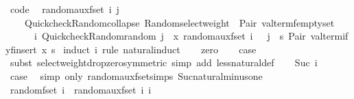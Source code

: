 \begin{isabellebody}
\isanewline
{}\isamarkupfalse%
\ {\isacharbrackleft}code{\isacharbrackright}{\isacharcolon}\isanewline
\ \ {\isachardoublequoteopen}random{\isacharunderscore}aux{\isacharunderscore}fset\ i\ j\ {\isacharequal}\isanewline
\ \ \ \ Quickcheck{\isacharunderscore}Random{\isachardot}collapse\ {\isacharparenleft}Random{\isachardot}select{\isacharunderscore}weight\ {\isacharbrackleft}{\isacharparenleft}{}{\isacharcomma}\ Pair\ valterm{\isacharunderscore}femptyset{\isacharparenright}{\isacharcomma}\isanewline
\ \ \ \ \ \ {\isacharparenleft}i{\isacharcomma}\ Quickcheck{\isacharunderscore}Random{\isachardot}random\ j\ {\isasymcirc}{\isasymrightarrow}\ {\isacharparenleft}{\isasymlambda}x{\isachardot}\ random{\isacharunderscore}aux{\isacharunderscore}fset\ {\isacharparenleft}i\ {\isacharminus}\ {}{\isacharparenright}\ j\ {\isasymcirc}{\isasymrightarrow}\ {\isacharparenleft}{\isasymlambda}s{\isachardot}\ Pair\ {\isacharparenleft}valtermify{\isacharunderscore}finsert\ x\ s{\isacharparenright}{\isacharparenright}{\isacharparenright}{\isacharparenright}{\isacharbrackright}{\isacharparenright}{\isachardoublequoteclose}\isanewline
%
\isadelimproof
%
\endisadelimproof
%
\isatagproof
{}\isamarkupfalse%
\ {\isacharparenleft}induct\ i\ rule{\isacharcolon}\ natural{\isachardot}induct{\isacharparenright}\isanewline
\ \ \isamarkupfalse%
\ zero\isanewline
\ \ \isamarkupfalse%
\ {\isacharquery}case\ \isamarkupfalse%
\ {\isacharparenleft}subst\ select{\isacharunderscore}weight{\isacharunderscore}drop{\isacharunderscore}zero{\isacharbrackleft}symmetric{\isacharbrackright}{\isacharparenright}\ {\isacharparenleft}simp\ add{\isacharcolon}\ less{\isacharunderscore}natural{\isacharunderscore}def{\isacharparenright}\isanewline
{}\isamarkupfalse%
\isanewline
\ \ \isamarkupfalse%
\ {\isacharparenleft}Suc\ i{\isacharparenright}\isanewline
\ \ \isamarkupfalse%
\ {\isacharquery}case\ \isamarkupfalse%
\ {\isacharparenleft}simp\ only{\isacharcolon}\ random{\isacharunderscore}aux{\isacharunderscore}fset{\isachardot}simps\ Suc{\isacharunderscore}natural{\isacharunderscore}minus{\isacharunderscore}one{\isacharparenright}\isanewline
{}\isamarkupfalse%
%
\endisatagproof
{\isafoldproof}%
%
\isadelimproof
\isanewline
%
\endisadelimproof
\isanewline
{}\isamarkupfalse%
\ {\isachardoublequoteopen}random{\isacharunderscore}fset\ i\ {\isacharequal}\ random{\isacharunderscore}aux{\isacharunderscore}fset\ i\ i{\isachardoublequoteclose}\isanewline

\end{isabellebody}
